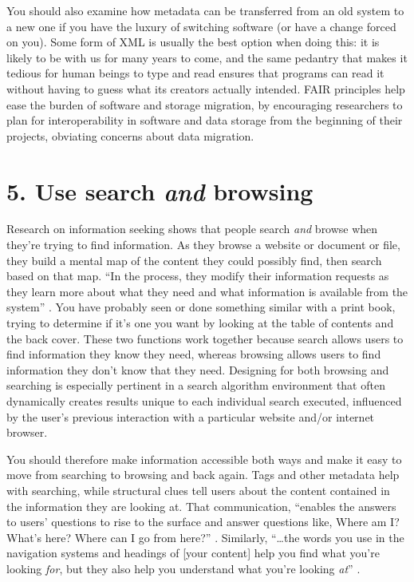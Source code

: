 \documentclass[10pt,letterpaper]{article}
\newcommand{\rulemajor}[1]{\section*{#1}}
\begin{document}
You should also examine how metadata can be transferred from an old system to a
new one if you have the luxury of switching software (or have a change
forced on you). Some form of XML is usually the best option when doing this: it
is likely to be with us for many years to come, and the same pedantry that makes
it tedious for human beings to type and read ensures that programs can read it
without having to guess what its creators actually intended.
FAIR principles help ease the burden of software and storage migration, by encouraging researchers to plan for interoperability in software and data storage from the beginning of their projects, obviating concerns about data migration.

\rulemajor{5. Use search \emph{and} browsing}

Research on information seeking shows that people search \emph{and} browse when
they're trying to find information. As they browse a website or document or
file, they build a mental map of the content they could possibly find, then
search based on that map. ``In the process, they modify their information
requests as they learn more about what they need and what information is
available from the system'' \cite{Rosenfeld2015}. You have probably seen or done
something similar with a print book, trying to determine if it's one you want by
looking at the table of contents and the back cover. These two functions work
together because search allows users to find information they know they need,
whereas browsing allows users to find information they don't know that they 
need\cite{Bates2002}. Designing for both browsing and searching is especially 
pertinent in a search algorithm environment that often dynamically creates 
results unique to each individual search executed, influenced by the user's 
previous interaction with a particular website and/or internet browser.

You should therefore make information accessible both ways and make it easy to
move from searching to browsing and back again. Tags and other metadata help
with searching, while structural clues tell users about the content contained in
the information they are looking at. That communication, ``enables the answers
to users' questions to rise to the surface and answer questions like, Where am
I? What's here? Where can I go from here?''  \cite{Rosenfeld2015}. Similarly,
``{\ldots}the words you use in the navigation systems and headings of [your
  content] help you find what you're looking \emph{for}, but they also help you
understand what you're looking \emph{at}'' \cite{Arango2018}.
\end{document}

